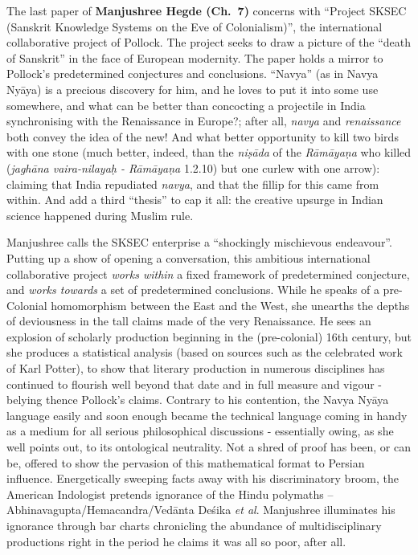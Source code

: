 The last paper of {\bf Manjushree Hegde (Ch.~7)} concerns with “Project SKSEC (Sanskrit Knowledge Systems on the Eve of Colonialism)”, the international collaborative project of Pollock. The project seeks to draw a picture of the “death of Sanskrit” in the face of European modernity. The paper holds a mirror to Pollock's predetermined conjectures and conclusions. “Navya” (as in Navya Nyāya) is a precious discovery for him, and he loves to put it into some use somewhere, and what can be better than concocting a projectile in India synchronising with the Renaissance in Europe?; after all, {\sl navya} and {\sl renaissance} both convey the idea of the new! And what better opportunity to kill two birds with one stone (much better, indeed, than the {\sl niṣāda} of the {\sl Rāmāyaṇa} who killed ({\sl jaghāna vaira-nilayaḥ - Rāmāyaṇa} 1.2.10) but one curlew with one arrow): claiming that India repudiated {\sl navya}, and that the fillip for this came from within. And add a third “thesis” to cap it all: the creative upsurge in Indian science happened during Muslim rule.

Manjushree calls the SKSEC enterprise a “shockingly mischievous endeavour”. Putting up a show of opening a conversation, this ambitious international collaborative project {\sl works within} a fixed framework of predetermined conjecture, and {\sl works towards} a set of predetermined conclusions. While he speaks of a pre-Colonial homomorphism between the East and the West, she unearths the depths of deviousness in the tall claims made of the very Renaissance. He sees an explosion of scholarly production beginning in the (pre-colonial) 16th century, but she produces a statistical analysis (based on sources such as the celebrated work of Karl Potter), to show that literary production in numerous disciplines has continued to flourish well beyond that date and in full measure and vigour - belying thence Pollock's claims. Contrary to his contention, the Navya Nyāya language easily and soon enough became the technical language coming in handy as a medium for all serious philosophical discussions - essentially owing, as she well points out, to its ontological neutrality. Not a shred of proof has been, or can be, offered to show the pervasion of this mathematical format to Persian influence. Energetically sweeping facts away with his discriminatory broom, the American Indologist pretends ignorance of the Hindu polymaths -- Abhinavagupta/Hemacandra/Vedānta Deśika {\sl et al}. Manjushree illuminates his ignorance through bar charts chronicling the abundance of multidisciplinary productions right in the period he claims it was all so poor, after all.

